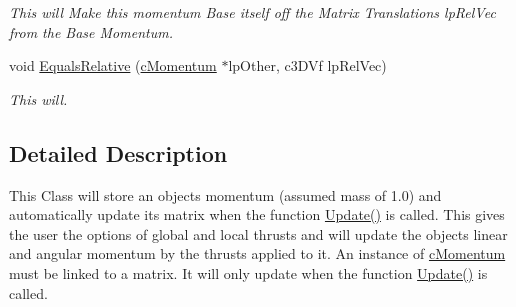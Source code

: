 \begin{DoxyCompactItemize}
\begin{DoxyCompactList}\small\item\em This will Make this momentum Base itself off the Matrix Translations lpRelVec from the Base Momentum. \end{DoxyCompactList}\item 
\hypertarget{classc_momentum_ad7c006b17a0f51bf910ba4969e2f67e4}{
void \hyperlink{classc_momentum_ad7c006b17a0f51bf910ba4969e2f67e4}{EqualsRelative} (\hyperlink{classc_momentum}{cMomentum} $\ast$lpOther, c3DVf lpRelVec)}
\label{classc_momentum_ad7c006b17a0f51bf910ba4969e2f67e4}

\begin{DoxyCompactList}\small\item\em This will. \end{DoxyCompactList}\end{DoxyCompactItemize}


\subsection{Detailed Description}
This Class will store an objects momentum (assumed mass of 1.0) and automatically update its matrix when the function \hyperlink{classc_momentum_ae860280e817e7afef71222afd0b12ec8}{Update()} is called. This gives the user the options of global and local thrusts and will update the objects linear and angular momentum by the thrusts applied to it. An instance of \hyperlink{classc_momentum}{cMomentum} must be linked to a matrix. It will only update when the function \hyperlink{classc_momentum_ae860280e817e7afef71222afd0b12ec8}{Update()} is called. 